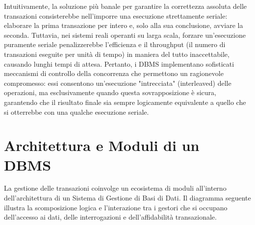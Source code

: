 Intuitivamente, la soluzione più banale per garantire la correttezza assoluta delle transazioni consisterebbe nell'imporre una esecuzione strettamente seriale: elaborare la prima transazione per intero e, solo alla sua conclusione, avviare la seconda. Tuttavia, nei sistemi reali operanti su larga scala, forzare un'esecuzione puramente seriale penalizzerebbe l'efficienza e il throughput (il numero di transazioni eseguite per unità di tempo) in maniera del tutto inaccettabile, causando lunghi tempi di attesa. Pertanto, i DBMS implementano sofisticati meccanismi di controllo della concorrenza che permettono un ragionevole compromesso: essi consentono un'esecuzione "intrecciata" (interleaved) delle operazioni, ma esclusivamente quando questa sovrapposizione è sicura, garantendo che il risultato finale sia sempre logicamente equivalente a quello che si otterrebbe con una qualche esecuzione seriale.

\section{Architettura e Moduli di un DBMS}

La gestione delle transazioni coinvolge un ecosistema di moduli all'interno dell'architettura di un Sistema di Gestione di Basi di Dati. Il diagramma seguente illustra la scomposizione logica e l'interazione tra i gestori che si occupano dell'accesso ai dati, delle interrogazioni e dell'affidabilità transazionale.

